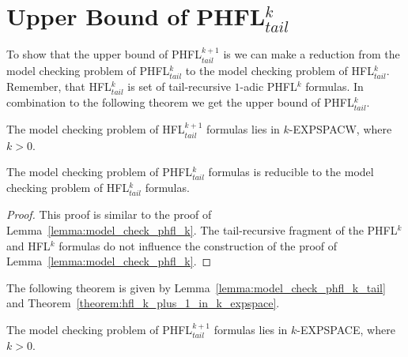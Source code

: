 
\section{Upper Bound of PHFL$^{k}_{tail}$}
\label{sec:phfl_k_plus_1_tail_equals_k_expspace_upper_bounds}
To show that the upper bound of PHFL$^{k + 1}_{tail}$ is  we can make a reduction from the model
checking problem of PHFL$^{k}_{tail}$ to the model checking problem of HFL$^k_{tail}$. Remember, that HFL$^k_{tail}$
is set of tail-recursive $1$-adic PHFL$^k$ formulas. In combination to the following theorem we get the upper bound
of PHFL$^k_{tail}$.

\begin{theorem}{\cite{bruse2017space}}
    \label{theorem:hfl_k_plus_1_in_k_expspace}
    The model checking problem of HFL$^{k + 1}_{tail}$ formulas lies in $k$-EXPSPACW, where $k > 0$.
\end{theorem}

\begin{lemma}
    \label{lemma:model_check_phfl_k_tail}
    The model checking problem of PHFL$^{k}_{tail}$ formulas is reducible to the model checking problem of
    HFL$^k_{tail}$ formulas.
\end{lemma}

\begin{proof}
    This proof is similar to the proof of Lemma~\ref{lemma:model_check_phfl_k}. The tail-recursive fragment of the
    PHFL$^k$ and HFL$^k$ formulas do not influence the construction of the proof of
    Lemma~\ref{lemma:model_check_phfl_k}.
\end{proof}
The following theorem is given by Lemma~\ref{lemma:model_check_phfl_k_tail} and
Theorem~\ref{theorem:hfl_k_plus_1_in_k_expspace}.

\begin{theorem}
    \label{theorem:phfl_k_in_k_exptime}
    The model checking problem of PHFL$^{k + 1}_{tail}$ formulas lies in $k$-EXPSPACE, where $k > 0$.
\end{theorem}